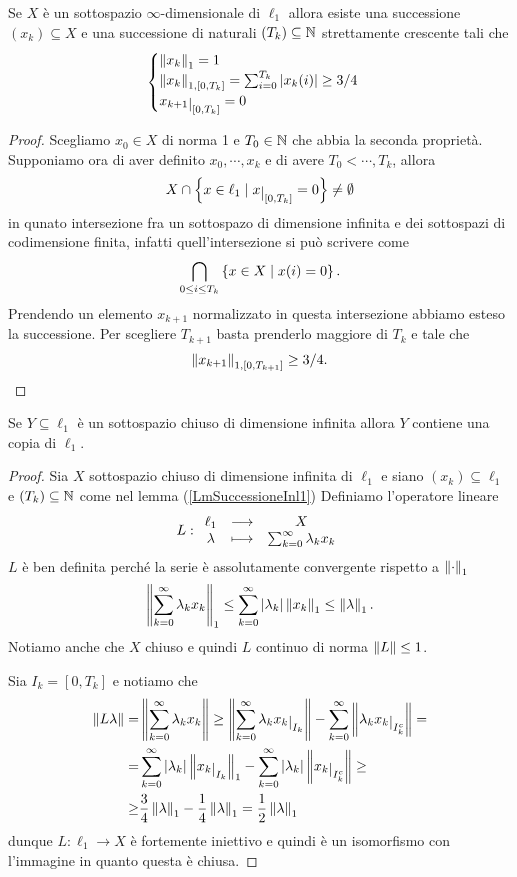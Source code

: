 \begin{lemma}\label{LmSuccessioneInl1}
Se $X$ \`e un sottospazio $\infty$-dimensionale di $\ell_1$ allora esiste una successione $(x_k)\subseteq X$ e una successione di naturali $(T_k)\subseteq \mathbb{N}$ strettamente crescente tali che 
\[\begin{cases}
\norm {x_k}_1=1\\
\norm{x_k}_{1,[0,T_k]}=\sum_{i=0}^{T_k}\abs{x_k(i)}\geq 3/4\\
x_{k+1}\res{[0,T_k]}=0
\end{cases}\]
\end{lemma}
\begin{proof}
Scegliamo $x_0\in X$ di norma 1 e $T_0\in \mathbb{N}$ che abbia la seconda propriet\`a. Supponiamo ora di aver definito $x_0,\cdots, x_k$ e di avere $T_0<\cdots, T_k$, allora
\[X\cap \cpa{x\in\ell_1\mid x\res{[0,T_k]}=0}\neq \emptyset\]
in qunato intersezione fra un sottospazo di dimensione infinita e dei sottospazi di codimensione finita, infatti quell'intersezione si pu\`o scrivere come
\[\bigcap_{0\leq i\leq T_k}\left\{{x\in X\mid x(i)=0}\right\}.\]
Prendendo un elemento $x_{k+1}$ normalizzato in questa intersezione abbiamo esteso la successione. Per scegliere $T_{k+1}$ basta prenderlo maggiore di $T_k$ e tale che 
\[\left\Vert{x_{k+1}}\right\Vert_{1,[0,T_{k+1}]}\geq 3/4.\]
\end{proof}

\begin{proposition}[]\label{PrSottospazioChiusoDil1Contienel1}
Se $Y\subseteq \ell_1$ \`e un sottospazio chiuso di dimensione infinita allora $Y$ contiene una copia di $\ell_1$.

\end{proposition}
\begin{proof}
Sia $X$ sottospazio chiuso di dimensione infinita di $\ell_1$ e siano $(x_k)\subseteq \ell_1$ e $(T_k)\subseteq \mathbb{N}$ come nel lemma (\ref{LmSuccessioneInl1}) Definiamo l'operatore lineare
\[L:\begin{array}{ccc} {\ell_1} & \longrightarrow & {X}\\ {\lambda} & \longmapsto & {\sum_{k=0}^\infty\lambda_k x_k} \end{array}\]
$L$ \`e ben definita perch\'e la serie \`e assolutamente convergente rispetto a ${\left\Vert{\cdot}\right\Vert}_1$
\[\left\Vert{\sum_{k=0}^\infty\lambda_k x_k}\right\Vert_1\leq \sum_{k=0}^\infty\left|{\lambda_k}\right| \left\Vert{x_k}\right\Vert_1\leq \left\Vert{\lambda}\right\Vert_1.\]
Notiamo anche che $X$ chiuso e quindi $L$ continuo di norma $\left\Vert{L}\right\Vert\leq 1$.

Sia $I_k=[0,T_k]$ e notiamo che
\begin{align*}
\norm{L\la}=&\norm{\sum_{k=0}^\infty\la_k x_k}\geq\norm{\sum_{k=0}^\infty\la_k x_k\res{I_k}}-\sum_{k=0}^\infty\norm{\la_k x_k\res{I_k^c}}=\\
=&\sum_{k=0}^\infty\abs{\la_k} \norm{x_k\res{I_k}}_1-\sum_{k=0}^\infty\abs{\la_k} \norm{x_k\res{I_k^c}}\geq\\
\geq&\frac34\norm\la_1-\frac14\norm{\la}_1=\frac12\norm\la_1
\end{align*}
dunque $L:\ell_1\to X$ \`e fortemente iniettivo e quindi \`e un isomorfismo con l'immagine in quanto questa \`e chiusa.
\end{proof}


